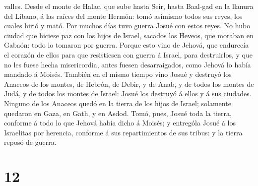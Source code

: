 valles.  Desde el monte de Halac, que sube hasta Seir,
hasta Baal-gad en la llanura del Líbano, á las raíces del monte Hermón:
tomó asimismo todos sus reyes, los cuales hirió y mató. 
Por muchos días tuvo guerra Josué con estos reyes.  No hubo
ciudad que hiciese paz con los hijos de Israel, sacados los Heveos, que
moraban en Gabaón: todo lo tomaron por guerra.  Porque esto
vino de Jehová, que endurecía el corazón de ellos para que resistiesen
con guerra á Israel, para destruirlos, y que no les fuese hecha
misericordia, antes fuesen desarraigados, como Jehová lo había mandado á
Moisés.  También en el mismo tiempo vino Josué y destruyó
los Anaceos de los montes, de Hebrón, de Debir, y de Anab, y de todos
los montes de Judá, y de todos los montes de Israel: Josué los destruyó
á ellos y á sus ciudades.  Ninguno de los Anaceos quedó en
la tierra de los hijos de Israel; solamente quedaron en Gaza, en Gath, y
en Asdod.  Tomó, pues, Josué toda la tierra, conforme á
todo lo que Jehová había dicho á Moisés; y entrególa Josué á los
Israelitas por herencia, conforme á sus repartimientos de sus tribus: y
la tierra reposó de guerra.

\hypertarget{section-11}{%
\section{12}\label{section-11}}

